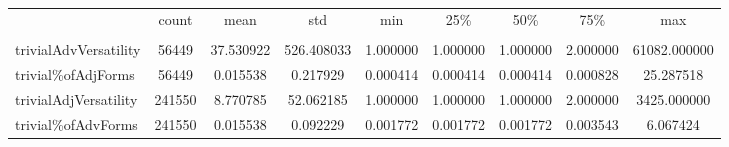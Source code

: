 

\singlespacing
\scriptsize\noindent
\begin{table}
\centering
\caption{}
\label{tab:trivial-vers-adv}
\begin{tabular}{*{1}{l}S[table-auto-round, table-format=7.2, drop-zero-decimal]
    S[table-auto-round, table-format=7.2, drop-zero-decimal]
    S[table-auto-round, table-format=7.2, drop-zero-decimal]
    S[table-auto-round, table-format=7.2, drop-zero-decimal]
    S[table-auto-round, table-format=7.2, drop-zero-decimal]
    S[table-auto-round, table-format=7.2, drop-zero-decimal]
    S[table-auto-round, table-format=7.2, drop-zero-decimal]
    S[table-auto-round, table-format=7.2, drop-zero-decimal]}
\toprule
{} & {count} & {mean} & {std} & {min} & {25\%} & {50\%} & {75\%} & {max} \\
{} & {} & {} & {} & {} & {} & {} & {} & {} \\
\midrule
trivialAdvVersatility & 56449 & 37.530922 & 526.408033 & 1.000000 & 1.000000 & 1.000000 & 2.000000 & 61082.000000 \\
trivial\%ofAdjForms & 56449 & 0.015538 & 0.217929 & 0.000414 & 0.000414 & 0.000414 & 0.000828 & 25.287518 \\
trivialAdjVersatility & 241550 & 8.770785 & 52.062185 & 1.000000 & 1.000000 & 1.000000 & 2.000000 & 3425.000000 \\
trivial\%ofAdvForms & 241550 & 0.015538 & 0.092229 & 0.001772 & 0.001772 & 0.001772 & 0.003543 & 6.067424 \\
\bottomrule
\end{tabular}
\end{table}

\normalsize
\normalspacing